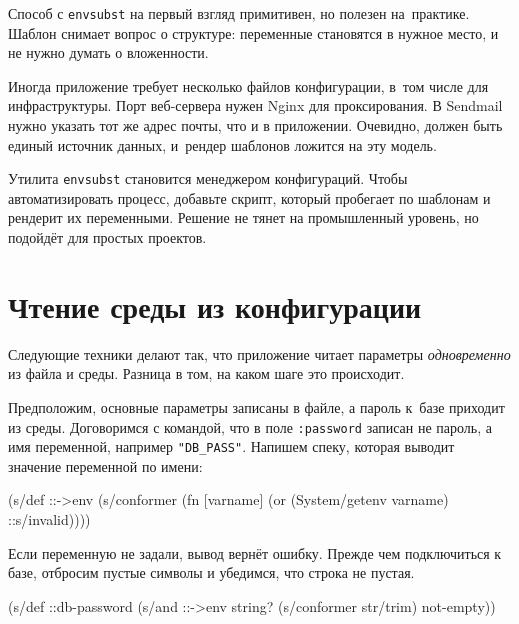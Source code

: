 \begin{english}
\end{english}

Способ с \verb|envsubst| на первый взгляд примитивен, но полезен
на~практике. Шаблон снимает вопрос о структуре: переменные становятся в нужное
место, и не нужно думать о вложенности.

Иногда приложение требует несколько файлов конфигурации, в~том числе для
инфраструктуры. Порт веб-сервера нужен Nginx для проксирования. В Sendmail нужно
указать тот же адрес почты, что и в приложении. Очевидно, должен быть единый
источник данных, и~рендер шаблонов ложится на эту модель.

Утилита \verb|envsubst| становится менеджером конфигураций. Чтобы
автоматизировать процесс, добавьте скрипт, который пробегает по шаблонам и
рендерит их переменными. Решение не тянет на промышленный уровень, но подойдёт
для простых проектов.

\section{Чтение среды из конфигурации}

Следующие техники делают так, что приложение читает параметры
\emph{одновременно} из файла и среды. Разница в том, на каком шаге это
происходит.

Предположим, основные параметры записаны в файле, а пароль к~базе приходит из
среды. Договоримся с командой, что в поле \verb|:password| записан не пароль,
а имя переменной, например \verb|"DB_PASS"|. Напишем спеку, которая выводит
значение переменной по имени:

\begin{english}
  \begin{clojure}
(s/def ::->env
  (s/conformer
   (fn [varname]
     (or (System/getenv varname)
         ::s/invalid))))
  \end{clojure}
\end{english}

Если переменную не задали, вывод вернёт ошибку. Прежде чем подключиться к базе,
отбросим пустые символы и убедимся, что строка не пустая.

\begin{english}
  \begin{clojure}
(s/def ::db-password
  (s/and ::->env
         string?
         (s/conformer str/trim)
         not-empty))
  \end{clojure}
\end{english}

